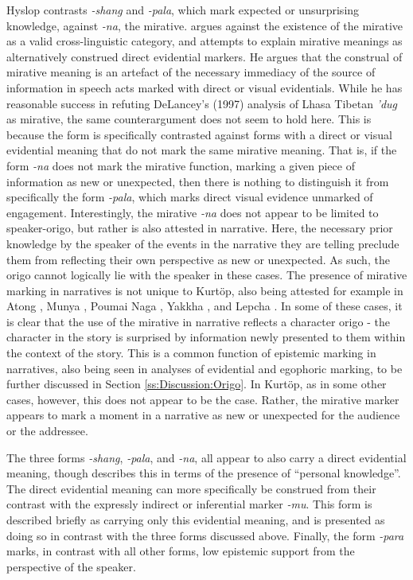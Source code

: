 Hyslop contrasts \textit{-shang} and \textit{-pala}, which mark expected or unsurprising knowledge, against \textit{-na}, the mirative.  argues against the existence of the mirative as a valid cross-linguistic category, and attempts to explain mirative meanings as alternatively construed direct evidential markers. He argues that the construal of mirative meaning is an artefact of the necessary immediacy of the source of information in speech acts marked with direct or visual evidentials. While he has reasonable success in refuting DeLancey's (1997)\nocite{DeLanceyMirativity1997} analysis of Lhasa Tibetan \textit{'dug} as mirative, the same counterargument does not seem to hold here. This is because the form is specifically contrasted against forms with a direct or visual evidential meaning that do not mark the same mirative meaning. That is, if the form \textit{-na} does not mark the mirative function, marking a given piece of information as new or unexpected, then there is nothing to distinguish it from specifically the form \textit{-pala}, which marks direct visual evidence unmarked of engagement. Interestingly, the mirative \textit{-na} does not appear to be limited to speaker-origo, but rather is also attested in narrative. Here, the necessary prior knowledge by the speaker of the events in the narrative they are telling preclude them from reflecting their own perspective as new or unexpected. As such, the origo cannot logically lie with the speaker in these cases. The presence of mirative marking in narratives is not unique to Kurtöp, also being attested for example in Atong \cite[Brahmaputran: India,][]{Breugel2014}, Munya \cite[Qiangic: PRC,][]{Bai2019}, Poumai Naga \cite[Angami-Pochuri: India,][]{Veikho2021}, Yakkha \cite[Kiranti: Nepal,][]{Schackow2015}, and Lepcha \cite[Internal Isolate: India,][]{Plaisier2007}. In some of these cases, it is clear that the use of the mirative in narrative reflects a character origo - the character in the story is surprised by information newly presented to them within the context of the story. This is a common function of epistemic marking in narratives, also being seen in analyses of evidential and egophoric marking, to be further discussed in Section \ref{ss:Discussion:Origo}. In Kurtöp, as in some other cases, however, this does not appear to be the case. Rather, the mirative marker appears to mark a moment in a narrative as new or unexpected for the audience or the addressee.

The three forms \textit{-shang}, \textit{-pala}, and \textit{-na}, all appear to also carry a direct evidential meaning, though  describes this in terms of the presence of ``personal knowledge''. The direct evidential meaning can more specifically be construed from their contrast with the expressly indirect or inferential marker \textit{-mu}. This form is described briefly as carrying only this evidential meaning, and is presented as doing so in contrast with the three forms discussed above. Finally, the form \textit{-para} marks, in contrast with all other forms, low epistemic support from the perspective of the speaker.

